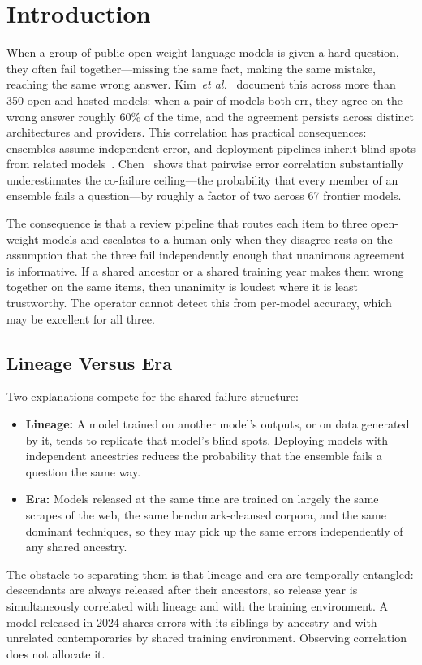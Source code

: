 \documentclass[11pt]{article}
\theoremstyle{definition}
\theoremstyle{plain}
\providecommand{\PARstart}[2]{#1#2}
\begin{document}
\section{Introduction}
\label{sec:introduction}

\PARstart{W}{hen} a group of public open-weight language models is given a hard question, they often fail together---missing the same fact, making the same mistake, reaching the same wrong answer. Kim~\textit{et al.}~\cite{kim2025} document this across more than 350 open and hosted models: when a pair of models both err, they agree on the wrong answer roughly 60\% of the time, and the agreement persists across distinct architectures and providers. This correlation has practical consequences: ensembles assume independent error, and deployment pipelines inherit blind spots from related models~\cite{li2026roots}. Chen~\cite{chen2026} shows that pairwise error correlation substantially underestimates the co-failure ceiling---the probability that every member of an ensemble fails a question---by roughly a factor of two across 67 frontier models.

The consequence is that a review pipeline that routes each item to three open-weight models and escalates to a human only when they disagree rests on the assumption that the three fail independently enough that unanimous agreement is informative. If a shared ancestor or a shared training year makes them wrong together on the same items, then unanimity is loudest where it is least trustworthy. The operator cannot detect this from per-model accuracy, which may be excellent for all three.

\subsection{Lineage Versus Era}
Two explanations compete for the shared failure structure:
\begin{itemize}
\item \textbf{Lineage:} A model trained on another model's outputs, or on data generated by it, tends to replicate that model's blind spots. Deploying models with independent ancestries reduces the probability that the ensemble fails a question the same way.
\item \textbf{Era:} Models released at the same time are trained on largely the same scrapes of the web, the same benchmark-cleansed corpora, and the same dominant techniques, so they may pick up the same errors independently of any shared ancestry.
\end{itemize}
The obstacle to separating them is that lineage and era are temporally entangled: descendants are always released after their ancestors, so release year is simultaneously correlated with lineage and with the training environment. A model released in 2024 shares errors with its siblings by ancestry and with unrelated contemporaries by shared training environment. Observing correlation does not allocate it.
\end{document}
